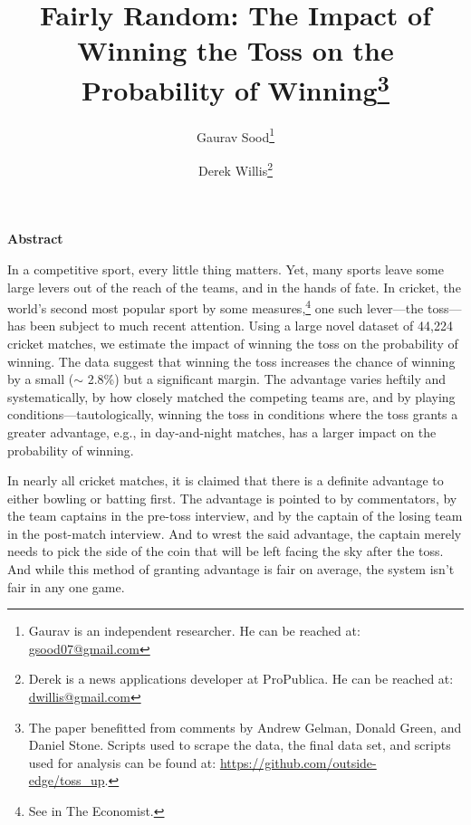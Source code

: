 \documentclass[12pt]{article}
\begin{document}
\title{\vspace{-.5cm}\normalsize{Fairly Random: The Impact of Winning the Toss on the Probability of Winning\footnote{The paper benefitted from comments by Andrew Gelman, Donald Green, and Daniel Stone. Scripts used to scrape the data, the final data set, and scripts used for analysis can be found at: \href{https://github.com/outside-edge/toss_up}{https://github.com/outside-edge/toss_up}. }\vspace{.5cm}}}
\author{\normalsize{Gaurav Sood}\footnote{Gaurav is an independent researcher. He can be reached at: \href{mailto:gsood07@gmail.com}{\small{gsood07@gmail.com}}} \and \normalsize{Derek Willis}\footnote{Derek is a  news applications developer at ProPublica. He can be reached at: \href{mailto:dwillis@gmail.com}{\small{dwillis@gmail.com}}}}\date{}
\maketitle
\doublespacing

\begin{center}\textbf{Abstract}\\\end{center}
In a competitive sport, every little thing matters. Yet, many sports leave some large levers out of the reach of the teams, and in the hands of fate. In cricket, the world's second most popular sport by some measures,\footnote{See \citet{Economist2011} in The Economist.} one such lever---the toss---has been subject to much recent attention. Using a large novel dataset of 44,224 cricket matches, we estimate the impact of winning the toss on the probability of winning. The data suggest that winning the toss increases the chance of winning by a small ($\sim$ 2.8\%) but a significant margin. The advantage varies heftily and systematically, by how closely matched the competing teams are, and by playing conditions---tautologically, winning the toss in conditions where the toss grants a greater advantage, e.g., in day-and-night matches, has a larger impact on the probability of winning.  
\clearpage

In nearly all cricket matches, it is claimed that there is a definite advantage to either bowling or batting first. The advantage is pointed to by commentators, by the team captains in the pre-toss interview, and by the captain of the losing team in the post-match interview. And to wrest the said advantage, the captain merely needs to pick the side of the coin that will be left facing the sky after the toss. And while this method of granting advantage is fair on average, the system isn't fair in any one game. 
\end{document}
